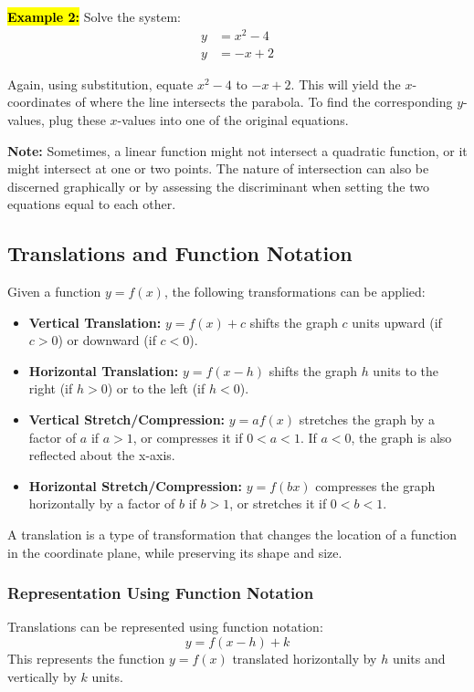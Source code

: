 \documentclass[12pt,a4paper]{article}
\begin{document}
\textbf{\hl{Example 2:}} Solve the system:
\[
\begin{aligned}
    y &= x^2 - 4 \\
    y &= -x + 2
\end{aligned}
\]

Again, using substitution, equate \(x^2 - 4\) to \(-x + 2\). This will yield the \(x\)-coordinates of where the line intersects the parabola. To find the corresponding \(y\)-values, plug these \(x\)-values into one of the original equations.

\textbf{Note:} Sometimes, a linear function might not intersect a quadratic function, or it might intersect at one or two points. The nature of intersection can also be discerned graphically or by assessing the discriminant when setting the two equations equal to each other.

\subsection*{Translations and Function Notation}

Given a function \( y = f(x) \), the following transformations can be applied:

\begin{itemize}
    \item \textbf{Vertical Translation:} \( y = f(x) + c \) shifts the graph \(c\) units upward (if \(c > 0\)) or downward (if \(c < 0\)).
    \item \textbf{Horizontal Translation:} \( y = f(x - h) \) shifts the graph \(h\) units to the right (if \(h > 0\)) or to the left (if \(h < 0\)).
    \item \textbf{Vertical Stretch/Compression:} \( y = af(x) \) stretches the graph by a factor of \(a\) if \(a > 1\), or compresses it if \(0 < a < 1\). If \(a < 0\), the graph is also reflected about the x-axis.
    \item \textbf{Horizontal Stretch/Compression:} \( y = f(bx) \) compresses the graph horizontally by a factor of \(b\) if \(b > 1\), or stretches it if \(0 < b < 1\).
\end{itemize}

A translation is a type of transformation that changes the location of a function in the coordinate plane, while preserving its shape and size.

\subsubsection*{Representation Using Function Notation}
Translations can be represented using function notation:
\[ y = f(x - h) + k \]
This represents the function \( y = f(x) \) translated horizontally by \( h \) units and vertically by \( k \) units.
\end{document}
